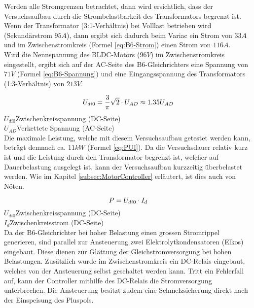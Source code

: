 Werden alle Stromgrenzen betrachtet, dann wird ersichtlich, dass der Versuchsaufbau durch die Strombelastbarkeit des Transformators begrenzt ist. Wenn der Transformator (3:1-Verhältnis) bei Volllast betrieben wird (Sekundärstrom $95A$), dann ergibt sich dadurch beim Variac ein Strom von $33A$ und im Zwischenstromkreis (Formel \ref{eq:B6-Strom}) einen Strom von $116A$.\\
Wird die Nennspannung des BLDC-Motors ($96V$) im Zwischenstromkreis eingestellt, ergibt sich auf der AC-Seite des B6-Gleichrichters eine Spannung von $71V$ (Formel \ref{eq:B6-Spannung}) und eine Eingangsspannung des Transformators (1:3-Verhältnis) von $213V$.

\begin{equation}
\centering
U_{di0}=\frac{3}{\pi}\sqrt{2}\cdot U_{AD}\approx 1.35U_{AD}
\label{eq:B6-Spannung}
\end{equation}
$  U_{di0} $\quad  Zwischenkreisspannung (DC-Seite)      \\
$ U_{AD} $\quad  Verkettete Spannung (AC-Seite)        \\

Die maximale Leistung, welche mit diesem Versuchsaufbau getestet werden kann, beträgt demnach ca. $11kW$ (Formel \ref{eq:PUI}). Da die Versuchsdauer relativ kurz ist und die Leistung durch den Transformator begrenzt ist, welcher auf Dauerbelastung ausgelegt ist, kann der Versuchsaufbau kurzzeitig überbelastet werden. Wie im Kapitel \ref{subsec:MotorController} erläutert, ist dies auch von Nöten.

\begin{equation}
\centering
P=U_{di0}\cdot I_{d}
\label{eq:PUI}
\end{equation}
$  U_{di0} $\quad  Zwischenkreisspannung (DC-Seite)      \\
$ I_{d} $\quad\quad 	Zwischenkreisstrom (DC-Seite)      \\


Da der B6-Gleichrichter bei hoher Belastung einen grossen Stromrippel generieren, sind parallel zur Ansteuerung zwei Elektrolytkondensatoren (Elkos) eingebaut. Diese dienen zur Glättung der Gleichstromversorgung bei hohen Belastungen. Zusätzlich wurde im Zwischenstromkreis ein DC-Relais eingebaut, welches von der Ansteuerung selbst geschaltet werden kann. Tritt ein Fehlerfall auf, kann der Controller mithilfe des DC-Relais die Stromversorgung unterbrechen. Die Ansteuerung besitzt zudem eine Schmelzsicherung direkt nach der Einspeisung des Pluspols.\\

